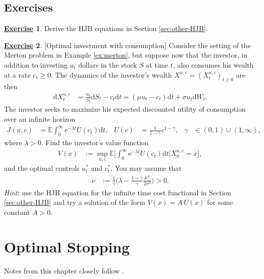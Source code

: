 \documentclass[12pt]{book}
\numberwithin{equation}{chapter}
\theoremstyle{plain}
\numberwithin{theorem}{section}
\theoremstyle{definition}
\newtheorem{exercise}{\underline{Exercise}}
\numberwithin{exercise}{chapter}
\newcommand{\<}{\langle}
\renewcommand{\>}{\rangle}
\renewcommand{\(}{\left(}
\renewcommand{\)}{\right)}
\renewcommand{\[}{\left[}
\renewcommand{\]}{\right]}
\newcommand\Eb{\mathds{E}}
\newcommand\sig{\sigma}
\newcommand\gam{\gamma}
\newcommand\lam{\lambda}
\newcommand\dd{\mathrm{d}}
\newcommand\ee{\mathrm{e}}
\begin{document}
\section{Exercises}
\label{sec:exercises-11}

\begin{exercise}
\label{exer:11.1}
Derive the HJB equations in Section \ref{sec:other-HJB}.
\end{exercise}

\begin{exercise}
\label{exer:11.2}
[Optimal investment with consumption]
Consider the setting of the Merton problem in Example \ref{ex:merton}, but suppose now that the investor, in addition to investing $u_t$ dollars in the stock $S$ at time $t$, also consumes his wealth at a rate $c_t \geq 0$.  The dynamics of the investor's wealth $X^{u,c} = (X_t^{u,c})_{t \geq 0}$ are then
\begin{align}
\dd X_t^{u,c}
	&=	\frac{u_t}{S_t} \dd S_t - c_t \dd t
	=		( \mu u_t - c_t ) \dd t + \sig u_t \dd W_t .
\end{align}
The investor seeks to maximize his expected discounted utility of consumption over an infinite horizon
\begin{align}
J(u,c)
	&=	\Eb \int_0^\infty \ee^{- \lam t} U(c_t) \dd t , &
U(c)
	&=	\frac{1}{1-\gam} c^{1-\gam} , &
\gam
	&\in (0,1) \cup (1,\infty) ,
\end{align}
where $\lam > 0$.  Find the investor's value function
\begin{align}
V(x)
	&:=	\sup_{u,c} \Eb \Big[ \int_0^\infty \ee^{- \lam t} U(c_t) \dd t \Big| X_0^{u,c} = x \Big] ,
\end{align}
and the optimal controls $u_t^*$ and $c_t^*$.  You may assume that
\begin{align}
\nu
	&:=	\frac{1}{\gam} \Big( \lam - \frac{1-\gam}{\gam} \frac{\mu^2}{2 \sig^2} \Big)
	>	0 .
\end{align}
\textit{Hint}: use the HJB equation for the infinite time cost functional in Section \ref{sec:other-HJB} and try a solution of the form $V(x) = A \, U(x)$ for some constant $A > 0$.
\end{exercise}



%
%

\chapter{Optimal Stopping}
\label{ch:optimal.stopping}
Notes from this chapter closely follow \cite[Chapter 9]{vanhandel}.
\end{document}
